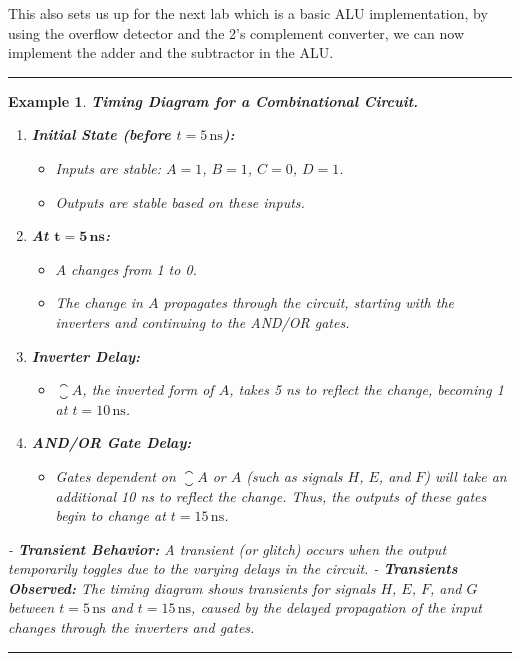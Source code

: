 \documentclass[12pt]{article}
\newtheorem{example}{Example}
\newenvironment{examp}
{\vspace{0.5cm}
\hrule
\begin{example}}
{\hrule
\vspace{0.5cm}
\end{example}}
\begin{document}
This also sets us up for the next lab which is a basic ALU implementation, by using the overflow detector and the 2's complement converter, we can now implement the adder and the subtractor in the ALU.
\begin{examp}
	\textnormal
	\textbf{Timing Diagram for a Combinational Circuit.}
	\begin{enumerate}
		\item  \textbf{Initial State (before \(t = 5 \, \text{ns}\)):}
		      \begin{itemize}
			      \item Inputs are stable: \(A = 1\), \(B = 1\), \(C = 0\), \(D = 1\).
			      \item  Outputs are stable based on these inputs.
		      \end{itemize}
		\item \textbf{At \(\mathbf{t = 5 \, \text{ns}}\):}
		      \begin{itemize}
			      \item \(A\) changes from 1 to 0.
			      \item  The change in \(A\) propagates through the circuit, starting with the inverters and continuing to the AND/OR gates.
		      \end{itemize}
		\item \textbf{Inverter Delay:}
		      \begin{itemize}
			      \item \(\closure{A}\), the inverted form of \(A\), takes 5 ns to reflect the change, becoming 1 at \(t = 10 \, \text{ns}\).
		      \end{itemize}
		\item \textbf{AND/OR Gate Delay:}
		      \begin{itemize}
			      \item Gates dependent on \(\closure{A}\) or \(A\) (such as signals \(H\), \(E\), and \(F\)) will take an additional 10 ns to reflect the change. Thus, the outputs of these gates begin to change at \(t = 15 \, \text{ns}\).
		      \end{itemize}
	\end{enumerate}
	- \textbf{Transient Behavior:} A transient (or glitch) occurs when the output temporarily toggles due to the varying delays in the circuit.
	\newline
	- \textbf{Transients Observed:} The timing diagram shows transients for signals \(H\), \(E\), \(F\), and \(G\) between \(t = 5 \, \text{ns}\) and \(t = 15 \, \text{ns}\), caused by the delayed propagation of the input changes through the inverters and gates.

\end{examp}
\end{document}
